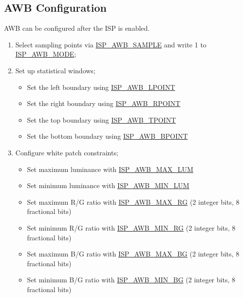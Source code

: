 \documentclass[main\_\_EN.tex]{subfiles}
\begin{document}
\subsection{AWB Configuration}
AWB can be configured after the ISP is enabled.

\begin{enumerate}
    \item Select sampling points via \hyperref[fielddesc:ISPAWBSAMPLE]{ISP\_AWB\_SAMPLE} and write 1 to \hyperref[fielddesc:ISPAWBMODE]{ISP\_AWB\_MODE};

    \item Set up statistical windows;
    \begin{itemize}
        \item Set the left boundary using \hyperref[fielddesc:ISPAWBLPOINT]{ISP\_AWB\_LPOINT}
        \item Set the right boundary using \hyperref[fielddesc:ISPAWBRPOINT]{ISP\_AWB\_RPOINT}
        \item Set the top boundary using \hyperref[fielddesc:ISPAWBTPOINT]{ISP\_AWB\_TPOINT}
        \item Set the bottom boundary using \hyperref[fielddesc:ISPAWBBPOINT]{ISP\_AWB\_BPOINT}
    \end{itemize}

    \item Configure white patch constraints;
    \begin{itemize}
        \item Set maximum luminance with \hyperref[fielddesc:ISPAWBMAXLUM]{ISP\_AWB\_MAX\_LUM}
        \item Set minimum luminance with \hyperref[fielddesc:ISPAWBMINLUM]{ISP\_AWB\_MIN\_LUM}
        \item Set maximum R/G ratio with \hyperref[fielddesc:ISPAWBMAXRG]{ISP\_AWB\_MAX\_RG} (2 integer bits, 8 fractional bits)
        \item Set minimum R/G ratio with \hyperref[fielddesc:ISPAWBMINRG]{ISP\_AWB\_MIN\_RG} (2 integer bits, 8 fractional bits)
        \item Set maximum B/G ratio with \hyperref[fielddesc:ISPAWBMAXBG]{ISP\_AWB\_MAX\_BG} (2 integer bits, 8 fractional bits)
        \item Set minimum B/G ratio with \hyperref[fielddesc:ISPAWBMINBG]{ISP\_AWB\_MIN\_BG} (2 integer bits, 8 fractional bits)
    \end{itemize}


\end{enumerate}
\end{document}
